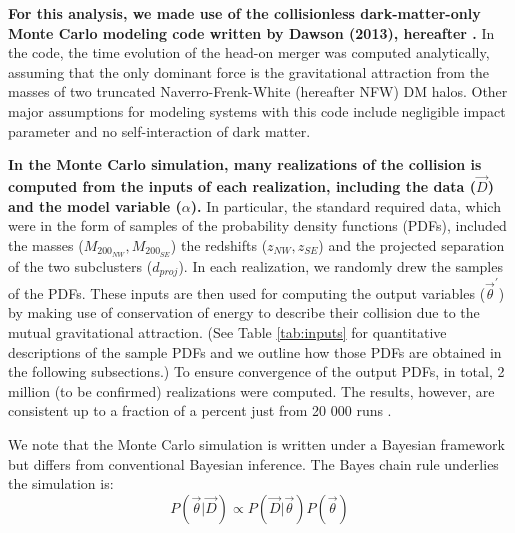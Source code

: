\textbf{For this analysis, we made use of the collisionless 
dark-matter-only Monte Carlo modeling code written by Dawson (2013),
hereafter . } 
In the code, the time evolution of the head-on merger was computed
analytically, assuming that the only dominant force is the gravitational attraction from
the masses of two truncated Naverro-Frenk-White (hereafter NFW) DM halos.
Other major assumptions for modeling systems with this code include
negligible impact parameter and no self-interaction of dark matter.\par

\textbf{In the Monte Carlo simulation, many realizations of the collision is
computed from the inputs of each realization, including
the data ($\vec{D}$) and the model variable ($\alpha$).} In particular,
the standard required data, which were in the form of samples of the probability density
functions (PDFs), included the masses ($M_{200_{NW}},M_{200_{SE}}$) the
redshifts ($z_{NW}, z_{SE}$) and the projected separation of the two
subclusters ($d_{proj}$).  
In each realization, we randomly drew the samples of the PDFs.
%
These inputs are then used for computing the output variables
($\vec{\theta}^\prime$) by making use of conservation of energy to describe
their collision due to the mutual gravitational attraction.
(See Table \ref{tab:inputs}
for quantitative descriptions of the sample PDFs and we outline how those
PDFs are obtained in the following subsections.) 
To ensure convergence of the output PDFs, in total, 2 million (to be
confirmed) realizations were computed. The results, however, are
consistent up to a fraction of a percent just from 20 000 runs
.\par    
We note that the Monte Carlo simulation is written under a Bayesian
framework but differs from conventional Bayesian inference. The Bayes
chain rule underlies the simulation is:
\begin{equation}
    P(\vec{\theta}|\vec{D}) \propto P(\vec{D}|\vec{\theta})P(\vec{\theta})
\end{equation}
